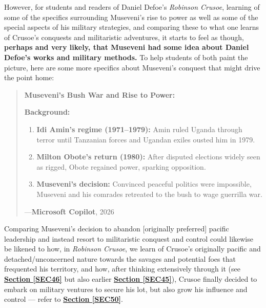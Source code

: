 \documentclass[a4paper]{article}
\begin{document}
However, for students and readers of Daniel Defoe's \textit{Robinson Crusoe}, learning of some of the specifics surrounding Museveni's rise to power as well as some of the special aspects of his military strategies, and comparing these to what one learns of Crusoe's conquests and militaristic adventures, it starts to feel as though, \textbf{perhaps and very likely, that Museveni had some idea about Daniel Defoe's works and military methods.} To help students of both paint the picture, here are some more specifics about Museveni's conquest that might drive the point home:


\noindent
\begin{minipage}{1\textwidth}
\vspace{1em}
\begin{quotation}
{\ttfamily

\textbf{Museveni's Bush War and Rise to Power:}

\textbf{Background:}
\begin{enumerate}
  \item \textbf{Idi Amin's regime (1971--1979):} Amin ruled Uganda through terror until Tanzanian forces and Ugandan exiles ousted him in 1979.
  \item \textbf{Milton Obote's return (1980):} After disputed elections widely seen as rigged, Obote regained power, sparking opposition.
  \item \textbf{Museveni's decision:} Convinced peaceful politics were impossible, Museveni and his comrades retreated to the bush to wage guerrilla war.
\end{enumerate}

}
\hspace*{\fill} ---\textbf{Microsoft Copilot}, 2026\cite{copilot_assistant}
\end{quotation}
\vspace{1em}
\end{minipage}


Comparing Museveni's decision to abandon [originally preferred] pacific leadership and instead resort to militaristic conquest and control could likewise be likened to how, in \textit{Robinson Crusoe}, we learn of Crusoe's originally pacific and detached/unconcerned nature towards the savages and potential foes that frequented his territory, and how, after thinking extensively through it (see \textbf{\hyperref[SEC46]{Section \ref{SEC46}}} but also earlier \textbf{\hyperref[SEC45]{Section \ref{SEC45}}}), Crusoe finally decided to embark on military ventures to secure his lot, but also grow his influence and control --- refer to  \textbf{\hyperref[SEC50]{Section \ref{SEC50}}}.
\end{document}
